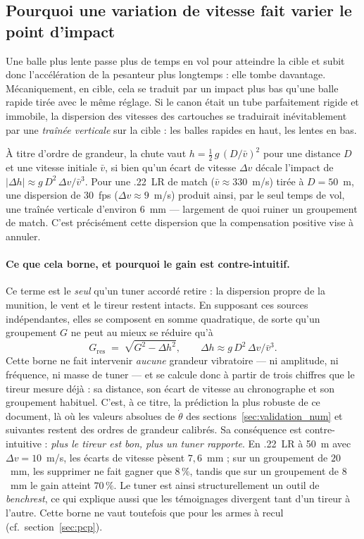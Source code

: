 \documentclass[12pt,a4paper]{article}
\begin{document}
	\subsection{Pourquoi une variation de vitesse fait varier le point d'impact}

	Une balle plus lente passe plus de temps en vol pour atteindre la cible et subit donc l'accélération de la pesanteur plus longtemps : elle tombe davantage. Mécaniquement, en cible, cela se traduit par un impact plus bas qu'une balle rapide tirée avec le même réglage. Si le canon était un tube parfaitement rigide et immobile, la dispersion des vitesses des cartouches se traduirait inévitablement par une \emph{traînée verticale} sur la cible : les balles rapides en haut, les lentes en bas.

	À titre d'ordre de grandeur, la chute vaut $h = \tfrac12\,g\,(D/\bar v)^2$ pour une distance $D$ et une vitesse initiale $\bar v$, si bien qu'un écart de vitesse $\Delta v$ décale l'impact de $|\Delta h| \approx g\,D^2\,\Delta v / \bar v^3$. Pour une .22~LR de match ($\bar v \approx 330$~m/s) tirée à $D = 50$~m, une dispersion de $30$~fps ($\Delta v \approx 9$~m/s) produit ainsi, par le seul temps de vol, une traînée verticale d'environ $6$~mm --- largement de quoi ruiner un groupement de match. C'est précisément cette dispersion que la compensation positive vise à annuler.

	\paragraph{Ce que cela borne, et pourquoi le gain est contre-intuitif.} Ce terme est le \emph{seul} qu'un tuner accordé retire : la dispersion propre de la munition, le vent et le tireur restent intacts. En supposant ces sources indépendantes, elles se composent en somme quadratique, de sorte qu'un groupement $G$ ne peut au mieux se réduire qu'à
	\begin{equation}
		G_\text{res} \;=\; \sqrt{G^2 - \Delta h^2}, \qquad \Delta h \approx g\,D^2\,\Delta v / \bar v^3.
		\label{eq:gres}
	\end{equation}
	Cette borne ne fait intervenir \emph{aucune} grandeur vibratoire --- ni amplitude, ni fréquence, ni masse de tuner --- et se calcule donc à partir de trois chiffres que le tireur mesure déjà : sa distance, son écart de vitesse au chronographe et son groupement habituel. C'est, à ce titre, la prédiction la plus robuste de ce document, là où les valeurs absolues de $\dot\theta$ des sections~\ref{sec:validation_num} et suivantes restent des ordres de grandeur calibrés. Sa conséquence est contre-intuitive : \emph{plus le tireur est bon, plus un tuner rapporte}. En .22~LR à 50~m avec $\Delta v = 10$~m/s, les écarts de vitesse pèsent $7{,}6$~mm ; sur un groupement de $20$~mm, les supprimer ne fait gagner que $8\,\%$, tandis que sur un groupement de $8$~mm le gain atteint $70\,\%$. Le tuner est ainsi structurellement un outil de \emph{benchrest}, ce qui explique aussi que les témoignages divergent tant d'un tireur à l'autre. Cette borne ne vaut toutefois que pour les armes à recul (cf.\ section~\ref{sec:pcp}).
\end{document}
